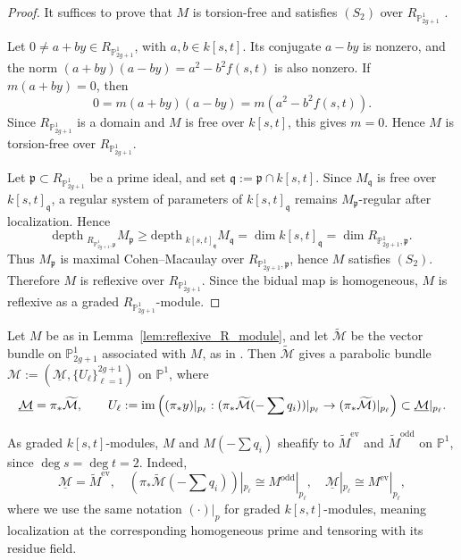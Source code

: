 \documentclass[12pt, letterpaper]{amsart}
\theoremstyle{definition}
\newcommand{\PP}{\mathbb{P} }
\newcommand{\cM}{\mathcal{M} }
\def\im{\mathrm{im}\, }
\def\depth{\mathrm{depth}\;}
\begin{document}
\begin{proof}
It suffices to prove that \(M\) is torsion-free and satisfies \((S_2)\) over \(R_{\PP_{2g+1}^1}\) \cite[Tag~0AVT]{SP}.

Let \(0\ne a+by\in R_{\PP_{2g+1}^1}\), with \(a,b\in k[s,t]\). Its conjugate \(a-by\) is nonzero, and the norm \((a+by)(a-by) = a^2 - b^2f(s,t)\) is also nonzero. If \(m(a+by)=0\), then
\[0=m(a+by)(a-by)=m(a^2-b^2f(s,t)).\]
Since \(R_{\PP_{2g+1}^1}\) is a domain and \(M\) is free over \(k[s,t]\), this gives \(m=0\). Hence \(M\) is torsion-free over \(R_{\PP_{2g+1}^1}\).

Let \(\mathfrak p\subset R_{\PP_{2g+1}^1}\) be a prime ideal, and set \(\mathfrak q:=\mathfrak p\cap k[s,t]\). Since \(M_{\mathfrak q}\) is free over \(k[s,t]_{\mathfrak q}\), a regular system of parameters of \(k[s,t]_{\mathfrak q}\) remains \(M_{\mathfrak p}\)-regular after localization. Hence
\[
\depth_{R_{\PP_{2g+1}^1,\mathfrak p}}M_{\mathfrak p}\ge\depth_{k[s,t]_{\mathfrak q}}M_{\mathfrak q}=\dim k[s,t]_{\mathfrak q}=\dim R_{\PP_{2g+1}^1,\mathfrak p}.
\]
Thus \(M_{\mathfrak p}\) is maximal Cohen--Macaulay over \(R_{\PP_{2g+1}^1,\mathfrak p}\), hence \(M\) satisfies \((S_2)\). Therefore \(M\) is reflexive over \(R_{\PP_{2g+1}^1}\). Since the bidual map is homogeneous, \(M\) is reflexive as a graded \(R_{\PP_{2g+1}^1}\)-module.
\end{proof}

Let \(M\) be as in Lemma~\ref{lem:reflexive_R_module}, and let \(\widetilde{\cM}\) be the vector bundle on \(\PP_{2g+1}^1\) associated with \(M\), as in \cite[Lemma~3.2]{HO20}. Then \(\widetilde{\cM}\) gives a parabolic bundle \(\cM := (\underline{\cM},\{U_\ell\}_{\ell=1}^{2g+1})\) on \(\PP^1\), where
\[
\underline{\cM}=\pi_*\widetilde{\cM},\qquad U_\ell:=\im\Bigl((\pi_*y)|_{p_\ell}:(\pi_*\widetilde{\cM}(-\sum q_i))|_{p_\ell}\to(\pi_*\widetilde{\cM})|_{p_\ell}\Bigr)\subset \underline{\cM}|_{p_\ell}.
\]

As graded \(k[s,t]\)-modules, \(M\) and \(M(-\sum q_i)\) sheafify to \(\widetilde{M}^{\mathrm{ev}}\) and \(\widetilde{M}^{\mathrm{odd}}\) on \(\PP^1\), since \(\deg s=\deg t=2\). Indeed,
\[
\underline{\cM}=\widetilde{M}^{\mathrm{ev}},\quad(\pi_*\widetilde{\cM}(-\sum q_i))|_{p_\ell}\cong M^{\mathrm{odd}}|_{p_\ell},\quad\underline{\cM}|_{p_\ell}\cong M^{\mathrm{ev}}|_{p_\ell},
\]
where we use the same notation \((\cdot)|_p\) for graded \(k[s,t]\)-modules, meaning localization at the corresponding homogeneous prime and tensoring with its residue field.
\end{document}
